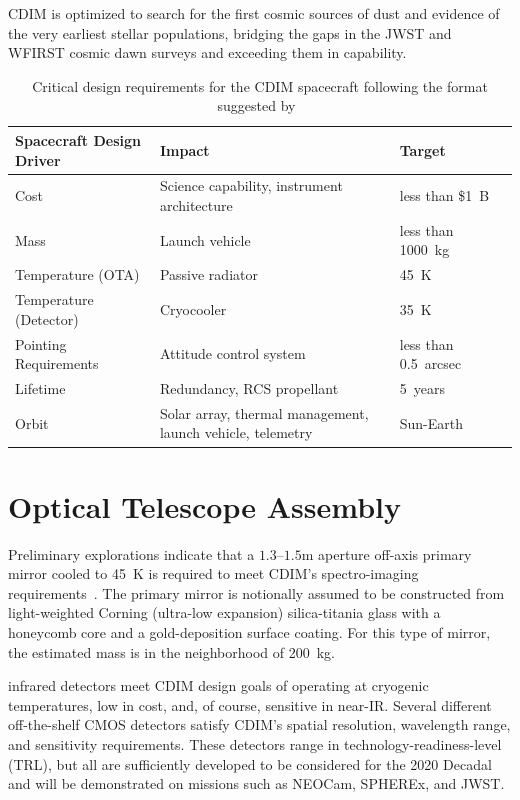 \documentclass{ws-jai}
\begin{document}
CDIM is optimized to search for the first cosmic sources of dust and evidence of the very earliest stellar populations, bridging the gaps in the JWST and WFIRST cosmic dawn surveys and exceeding them in capability.

\begin{table}
  \caption{Critical design requirements for the CDIM spacecraft following the format suggested by~\citeauthor{smad2015}}
  \small\centering
  \begin{tabular}{@{}llll@{}} \toprule
    Spacecraft Design Driver & Impact & Target \\ \midrule
    Cost & Science capability, instrument architecture & less than \$\SI{1}{B} \\
    Mass & Launch vehicle & less than \SI{1000}{\kilo\gram} \\
    Temperature (OTA) & Passive radiator & \SI{45}{\kelvin} \\
    Temperature (Detector) & Cryocooler & \SI{35}{\kelvin} \\
    Pointing Requirements & Attitude control system & less than \SI{0.5}{arcsec} \\
    Lifetime & Redundancy, RCS propellant & \SI{5}{years} \\
    Orbit & Solar array, thermal management, launch vehicle, telemetry & Sun-Earth \Ltwo{} \\
    \bottomrule
  \end{tabular}
\label{tab:critical-params}
\end{table}

\section{Optical Telescope Assembly}
\label{sec:ota}
Preliminary explorations indicate that a $1.3$--$1.5$\si{\meter} aperture off-axis primary mirror cooled to \SI{45}{\kelvin} is required to meet CDIM's spectro-imaging  requirements~\cite{cooray2016cdim2page}.
The primary mirror is notionally assumed to be constructed from light-weighted Corning (ultra-low expansion) silica-titania glass with a honeycomb core and a gold-deposition surface coating.
For this type of mirror, the estimated mass is in the neighborhood of \SI{200}{\kilo\gram}.

 infrared detectors meet CDIM design goals of operating at cryogenic temperatures, low in cost, and, of course, sensitive in near-IR.\@
Several different off-the-shelf CMOS detectors satisfy CDIM's spatial resolution, wavelength range, and sensitivity requirements.
These detectors range in technology-readiness-level (TRL), but all are sufficiently developed to be considered for the 2020 Decadal and will be demonstrated on missions such as NEOCam, SPHEREx, and JWST\@. 
\end{document}
